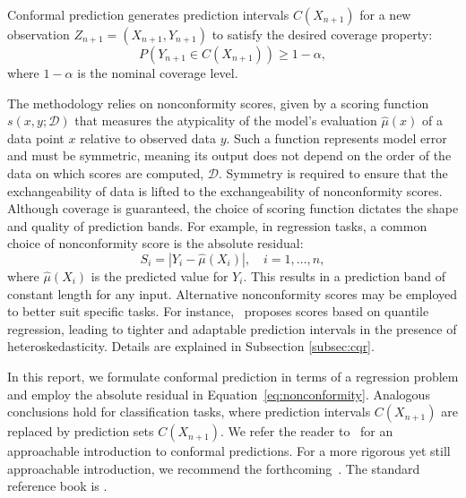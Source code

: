 \documentclass{article}
\theoremstyle{definition}
\begin{document}
Conformal prediction generates prediction intervals $C(X_{n+1})$ for a new observation $Z_{n+1} = (X_{n+1}, Y_{n+1})$ to satisfy the desired coverage property:
\begin{equation} \label{eq:coverage}
    P(Y_{n+1} \in C(X_{n+1})) \geq 1 - \alpha,
\end{equation}
where $1 - \alpha$ is the nominal coverage level.


The methodology relies on nonconformity scores, given by a scoring function $s(x, y; \mathcal{D})$ that measures the atypicality of the model's evaluation $\hat{\mu}(x)$ of a data point $x$ relative to observed data $y$. Such a function represents model error and must be symmetric, meaning its output does not depend on the order of the data on which scores are computed, $\mathcal{D}$. Symmetry is required to ensure that the exchangeability of data is lifted to the exchangeability of nonconformity scores. Although coverage is guaranteed, the choice of scoring function dictates the shape and quality of prediction bands. For example, in regression tasks, a common choice of nonconformity score is the absolute residual:
\begin{equation} \label{eq:nonconformity}
    S_i = |Y_i - \hat{\mu}(X_i)|, \quad i = 1, \ldots, n,
\end{equation}
where $\hat{\mu}(X_i)$ is the predicted value for $Y_i$. This results in a prediction band of constant length for any input. Alternative nonconformity scores may be employed to better suit specific tasks. For instance,~\cite{cqr} proposes scores based on quantile regression, leading to tighter and adaptable prediction intervals in the presence of heteroskedasticity. Details are explained in Subsection \ref{subsec:cqr}.

In this report, we formulate conformal prediction in terms of a regression problem and employ the absolute residual in Equation~\eqref{eq:nonconformity}. Analogous conclusions hold for classification tasks, where prediction intervals $C(X_{n+1})$ are replaced by prediction sets $C(X_{n+1})$. We refer the reader to~\cite{gentle-intro} for an approachable introduction to conformal predictions. For a more rigorous yet still approachable introduction, we recommend the forthcoming~\cite{angelopoulos2024theoretical-foundations-cp}. The standard reference book is \cite{vovk2022algorithmic}.
\end{document}
